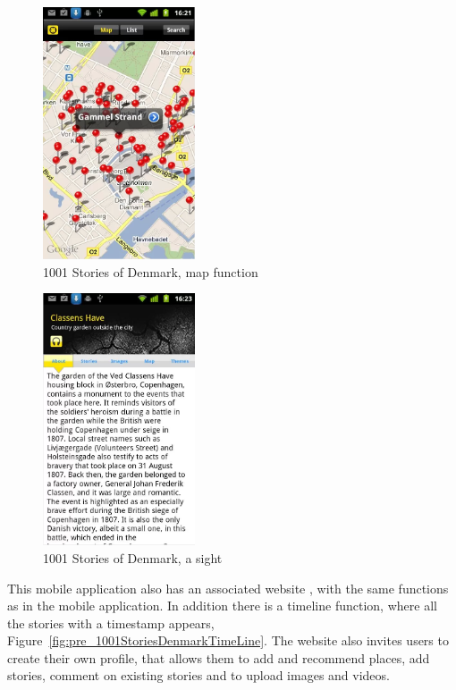 \documentclass[11pt]{book}
\begin{document}
\begin{figure}[H]
      \centering
      \includegraphics[width=0.4\textwidth]{Figures/Prestudy/1001storiesMap.png}
      \caption{1001 Stories of Denmark, map function}
      \label{fig:pre_1001StoriesDenmarkAppMap}
\end{figure}

\begin{figure}[H]
      \centering
      \includegraphics[width=0.4\textwidth]{Figures/Prestudy/1001storiesStory.png}
      \caption{1001 Stories of Denmark, a sight}
      \label{fig:pre_1001StoriesDenmarkAppStory}
\end{figure}

This mobile application also has an associated website \cite{1001fort}, with the same functions as in the mobile application. In addition there is a timeline function, where all the stories with a timestamp appears, Figure~\ref{fig:pre_1001StoriesDenmarkTimeLine}. The website also invites users to create their own profile, that allows them to add and recommend places, add stories, comment on existing stories and to  upload images and videos.
\end{document}
